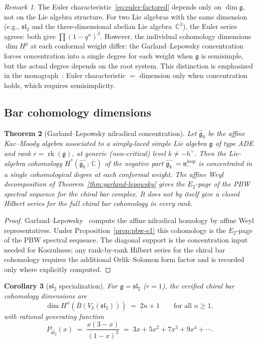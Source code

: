 \documentclass[11pt]{article}
\theoremstyle{plain}
\newtheorem{theorem}{Theorem}[section]
\newtheorem{corollary}[theorem]{Corollary}
\theoremstyle{definition}
\theoremstyle{remark}
\newtheorem{remark}[theorem]{Remark}
\newcommand{\fg}{\mathfrak{g}}
\newcommand{\fn}{\mathfrak{n}}
\newcommand{\fsl}{\mathfrak{sl}}
\newcommand{\barB}{\bar{B}}
\DeclareMathOperator{\rk}{rk}
\numberwithin{equation}{section}
\begin{document}
\begin{remark}\label{rem:euler-vs-dim}
The Euler characteristic~\eqref{eq:euler-factored}
depends only on $\dim\fg$, not on the Lie algebra
structure. For two Lie algebras with the same dimension
(e.g., $\fsl_2$ and the three-dimensional abelian Lie
algebra~$\mathbb{C}^3$), the
Euler series agrees: both give
$\prod(1-q^n)^3$. However, the individual cohomology
dimensions $\dim H^p$ at each conformal weight differ:
the Garland--Lepowsky concentration forces concentration
into a single degree for each weight when $\fg$ is
semisimple, but the actual degree depends on the root
system. This distinction is emphasized in the
monograph~\cite{Lor-MKD}: Euler characteristic
$=$ dimension only when concentration holds, which
requires semisimplicity.
\end{remark}

\subsection{Bar cohomology dimensions}

\begin{theorem}[Garland--Lepowsky nilradical concentration]
\label{thm:bar-hilbert-ADE}
Let $\widehat{\fg}_k$ be the affine Kac--Moody algebra
associated to a simply-laced simple Lie algebra $\fg$ of type
ADE and rank $r = \rk(\fg)$, at generic (non-critical) level
$k \neq -h^\vee$. Then the Lie-algebra cohomology
$H^*(\widehat{\fg}_k^-;\,\mathbb{C})$ of the negative part
$\widehat{\fg}_k^- = \fn_-^{\mathrm{loop}}$ is concentrated in
a single cohomological degree at each conformal weight. The affine
Weyl decomposition of Theorem~\ref{thm:garland-lepowsky} gives the
\(E_2\)-page of the PBW spectral sequence for the chiral bar complex.
It does not by itself give a closed Hilbert series for the full chiral
bar cohomology in every rank.
\end{theorem}

\begin{proof}
Garland--Lepowsky~\cite{GL76} compute the affine nilradical homology
by affine Weyl representatives. Under Proposition~\ref{prop:pbw-e1}
this cohomology is the \(E_2\)-page of the PBW spectral sequence. The
diagonal support is the concentration input needed for Koszulness; any
rank-by-rank Hilbert series for the chiral bar cohomology requires the
additional Orlik--Solomon form factor and is recorded only where
explicitly computed.
\end{proof}

\begin{corollary}[$\fsl_2$ specialization]\label{cor:bar-dim-formula}
For $\fg = \fsl_2$ ($r = 1$), the verified chiral bar cohomology
dimensions are
\begin{equation}\label{eq:sl2-bar-dim}
\dim H^n(\barB(V_k(\fsl_2))) \;=\; 2n + 1
\qquad \text{for all } n \geq 1,
\end{equation}
with rational generating function
\begin{equation}\label{eq:sl2-gf}
P_{\widehat{\fsl}_2}(x)
\;=\; \frac{x(3-x)}{(1-x)^2}
\;=\; 3x + 5x^2 + 7x^3 + 9x^4 + \cdots.
\end{equation}
\end{corollary}
\end{document}

